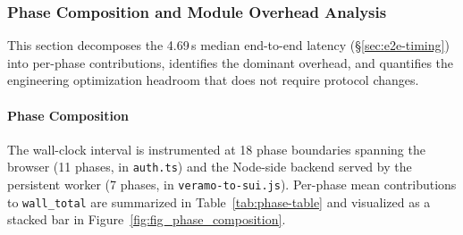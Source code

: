 %
%
%

\subsubsection{Phase Composition and Module Overhead Analysis}
\label{sec:phase-module}

This section decomposes the 4.69\,s median end-to-end latency
(\S\ref{sec:e2e-timing}) into per-phase contributions, identifies the
dominant overhead, and quantifies the engineering optimization headroom
that does not require protocol changes.

\paragraph{Phase Composition}

The wall-clock interval is instrumented at 18 phase boundaries spanning
the browser (11 phases, in \texttt{auth.ts}) and the Node-side backend
served by the persistent worker (7 phases, in \texttt{veramo-to-sui.js}).
Per-phase mean contributions to \texttt{wall\_total} are summarized in
Table~\ref{tab:phase-table} and visualized as a stacked bar in
Figure~\ref{fig:fig_phase_composition}.


